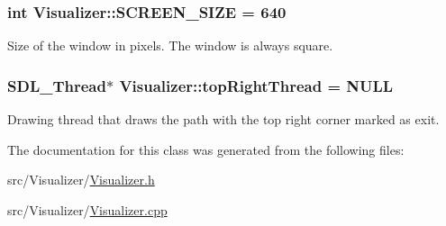 \subsubsection[{\texorpdfstring{S\+C\+R\+E\+E\+N\+\_\+\+S\+I\+ZE}{SCREEN_SIZE}}]{\setlength{\rightskip}{0pt plus 5cm}int Visualizer\+::\+S\+C\+R\+E\+E\+N\+\_\+\+S\+I\+ZE = 640}\hypertarget{class_visualizer_a5dab241289bfd894f141b07a0f34f70d}{}\label{class_visualizer_a5dab241289bfd894f141b07a0f34f70d}
Size of the window in pixels. The window is always square. 
\subsubsection[{\texorpdfstring{top\+Right\+Thread}{topRightThread}}]{\setlength{\rightskip}{0pt plus 5cm}S\+D\+L\+\_\+\+Thread$\ast$ Visualizer\+::top\+Right\+Thread = N\+U\+LL}\hypertarget{class_visualizer_a0aed37d9a5c9c7f89bfb5a87e4cf3898}{}\label{class_visualizer_a0aed37d9a5c9c7f89bfb5a87e4cf3898}
Drawing thread that draws the path with the top right corner marked as exit. 

The documentation for this class was generated from the following files\+:\begin{DoxyCompactItemize}
\item 
src/\+Visualizer/\hyperlink{_visualizer_8h}{Visualizer.\+h}\item 
src/\+Visualizer/\hyperlink{_visualizer_8cpp}{Visualizer.\+cpp}\end{DoxyCompactItemize}
